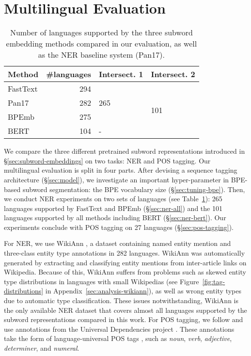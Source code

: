 \documentclass[11pt,a4paper]{article}
\makeatletter
\newcommand\Biggg{\bBigg@{3.5}}
\newcommand\secref[1]{\S\ref{#1}}
\makeatother
\begin{document}
\section{Multilingual Evaluation}
\label{sec:eval}
\begin{table}
	\centering
	\small
	\begin{adjustbox}{max width=\linewidth}
		\begin{tabular}{lrll}
			\toprule
			Method & \#languages & Intersect. 1 & Intersect. 2\\
			\midrule
			FastText & 294 & \multirow{3}{2em}{\Bigg{\}}265} & \multirow{4}{2em}{\Biggg{\}}101} \\ 
			Pan17 & 282 & \\
			BPEmb & 275 &  \\
			BERT & 104  & - \\
			\bottomrule
		\end{tabular}
	\end{adjustbox}
	\caption{Number of languages supported by the three subword embedding methods compared in our evaluation, as well as the NER baseline system (Pan17).}
	\label{tbl:num-langs}
\end{table}
We compare the three different pretrained subword representations introduced in \secref{sec:subword-embeddings} on two tasks: NER and POS tagging.
Our multilingual evaluation is split in four parts.
After devising a sequence tagging architecture (\secref{sec:model}), we investigate an important hyper-parameter in BPE-based subword segmentation: the BPE vocabulary size (\secref{sec:tuning-bpe}).
Then, we conduct NER experiments on two sets of languages (see Table~\ref{tbl:num-langs}): 265 languages supported by FastText and BPEmb (\secref{sec:ner-all}) and the 101 languages supported by all methods including BERT (\secref{sec:ner-bert}).
Our experiments conclude with POS tagging on 27 languages (\secref{sec:pos-tagging}).

 For NER, we use WikiAnn \citep{pan2017crosslingual}, a dataset containing named entity mention and three-class entity type annotations in 282 languages.
WikiAnn was automatically generated by extracting and classifying entity mentions from inter-article links on Wikipedia.
Because of this, WikiAnn suffers from problems such as skewed entity type distributions in languages with small Wikipedias (see Figure~\ref{fig:tag-distributions} in Appendix~\ref{sec:analysis-wikiann}), as well as wrong entity types due to automatic type classification.
These issues notwithstanding, WikiAnn is the only available NER dataset that covers almost all languages supported by the subword representations compared in this work.
For POS tagging, we follow \citet{plank2016multilingual,yasunaga2018robust} and use annotations from the Universal Dependencies project \citep{nivre2016universal}.
These annotations take the form of language-universal POS tags \citep{petrov2012universal}, such as \emph{noun}, \emph{verb}, \emph{adjective}, \emph{determiner}, and \emph{numeral}.
\end{document}
